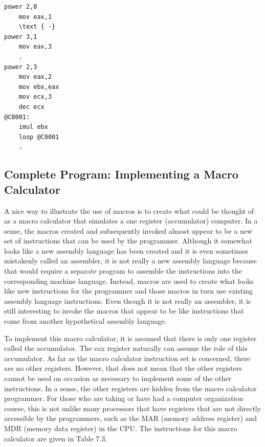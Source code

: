 \documentclass[10pt]{article}
\begin{document}
\begin{verbatim}
power 2,0
    mov eax,1
    \text { -}
power 3,1
    mov eax,3
    .
power 2,3
    mov eax,2
    mov ebx,eax
    mov ecx,3
    dec ecx
@C0001:
    imul ebx
    loop @C0001
    .
\end{verbatim}

\subsection*{Complete Program: Implementing a Macro Calculator}
A nice way to illustrate the use of macros is to create what could be thought of as a macro calculator that simulates a one register (accumulator) computer. In a sense, the macros created and subsequently invoked almost appear to be a new set of instructions that can be used by the programmer. Although it somewhat looks like a new assembly language has been created and it is even sometimes mistakenly called an assembler, it is not really a new assembly language because that would require a separate program to assemble the instructions into the corresponding machine language. Instead, macros are used to create what looks like new instructions for the programmer and those macros in turn use existing assembly language instructions. Even though it is not really an assembler, it is still interesting to invoke the macros that appear to be like instructions that come from another hypothetical assembly language.

To implement this macro calculator, it is assumed that there is only one register called the accumulator. The eax register naturally can assume the role of this accumulator. As far as the macro calculator instruction set is concerned, there are no other registers. However, that does not mean that the other registers cannot be used on occasion as necessary to implement some of the other instructions. In a sense, the other registers are hidden from the macro calculator programmer. For those who are taking or have had a computer organization course, this is not unlike many processors that have registers that are not directly accessible by the programmers, such as the MAR (memory address register) and MDR (memory data register) in the CPU. The instructions for this macro calculator are given in Table 7.3.
\end{document}
